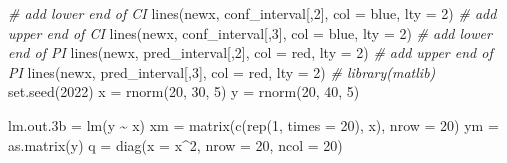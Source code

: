 \documentclass[
]{article}
\newenvironment{Shaded}{\begin{snugshade}}{\end{snugshade}}
\newcommand{\AttributeTok}[1]{\textcolor[rgb]{0.77,0.63,0.00}{#1}}
\newcommand{\CommentTok}[1]{\textcolor[rgb]{0.56,0.35,0.01}{\textit{#1}}}
\newcommand{\DecValTok}[1]{\textcolor[rgb]{0.00,0.00,0.81}{#1}}
\newcommand{\FloatTok}[1]{\textcolor[rgb]{0.00,0.00,0.81}{#1}}
\newcommand{\FunctionTok}[1]{\textcolor[rgb]{0.00,0.00,0.00}{#1}}
\newcommand{\NormalTok}[1]{#1}
\newcommand{\OtherTok}[1]{\textcolor[rgb]{0.56,0.35,0.01}{#1}}
\newcommand{\SpecialCharTok}[1]{\textcolor[rgb]{0.00,0.00,0.00}{#1}}
\newcommand{\StringTok}[1]{\textcolor[rgb]{0.31,0.60,0.02}{#1}}
\begin{document}
\begin{Shaded}
\begin{Highlighting}[]
\CommentTok{\# add lower end of CI}
\FunctionTok{lines}\NormalTok{(newx, conf\_interval[,}\DecValTok{2}\NormalTok{], }\AttributeTok{col =} \StringTok{\textquotesingle{}blue\textquotesingle{}}\NormalTok{, }\AttributeTok{lty =} \DecValTok{2}\NormalTok{)}
\CommentTok{\# add upper end of CI}
\FunctionTok{lines}\NormalTok{(newx, conf\_interval[,}\DecValTok{3}\NormalTok{], }\AttributeTok{col =} \StringTok{\textquotesingle{}blue\textquotesingle{}}\NormalTok{, }\AttributeTok{lty =} \DecValTok{2}\NormalTok{)}
\CommentTok{\# add lower end of PI}
\FunctionTok{lines}\NormalTok{(newx, pred\_interval[,}\DecValTok{2}\NormalTok{], }\AttributeTok{col =} \StringTok{\textquotesingle{}red\textquotesingle{}}\NormalTok{, }\AttributeTok{lty =} \DecValTok{2}\NormalTok{)}
\CommentTok{\# add upper end of PI}
\FunctionTok{lines}\NormalTok{(newx, pred\_interval[,}\DecValTok{3}\NormalTok{], }\AttributeTok{col =} \StringTok{\textquotesingle{}red\textquotesingle{}}\NormalTok{, }\AttributeTok{lty =} \DecValTok{2}\NormalTok{)}
\CommentTok{\# library(matlib)}
\FunctionTok{set.seed}\NormalTok{(}\DecValTok{2022}\NormalTok{)}
\NormalTok{x }\OtherTok{=} \FunctionTok{rnorm}\NormalTok{(}\DecValTok{20}\NormalTok{, }\DecValTok{30}\NormalTok{, }\DecValTok{5}\NormalTok{)}
\NormalTok{y }\OtherTok{=} \FunctionTok{rnorm}\NormalTok{(}\DecValTok{20}\NormalTok{, }\DecValTok{40}\NormalTok{, }\DecValTok{5}\NormalTok{)}


\NormalTok{lm.out}\FloatTok{.3}\NormalTok{b }\OtherTok{=} \FunctionTok{lm}\NormalTok{(y }\SpecialCharTok{\textasciitilde{}}\NormalTok{ x)}
\NormalTok{xm }\OtherTok{=} \FunctionTok{matrix}\NormalTok{(}\FunctionTok{c}\NormalTok{(}\FunctionTok{rep}\NormalTok{(}\DecValTok{1}\NormalTok{, }\AttributeTok{times =} \DecValTok{20}\NormalTok{), x), }\AttributeTok{nrow =} \DecValTok{20}\NormalTok{)}
\NormalTok{ym }\OtherTok{=} \FunctionTok{as.matrix}\NormalTok{(y)}
\NormalTok{q  }\OtherTok{=} \FunctionTok{diag}\NormalTok{(}\AttributeTok{x =}\NormalTok{ x}\SpecialCharTok{\^{}}\DecValTok{2}\NormalTok{, }\AttributeTok{nrow =} \DecValTok{20}\NormalTok{, }\AttributeTok{ncol =} \DecValTok{20}\NormalTok{)}


\end{Highlighting}
\end{Shaded}
\end{document}
